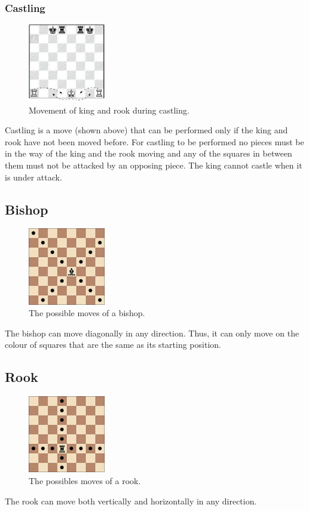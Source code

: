 \subsubsection{Castling}
\begin{figure}[H]
\centering
	\includegraphics[width=0.3\textwidth]{images/boards/castling}
	\caption{Movement of king and rook during castling.}
\end{figure}
Castling is a move (shown above) that can be performed only if the king and rook have not been moved before. For castling to be performed no pieces must be in the way of the king and the rook moving and any of the squares in between them must not be attacked by an opposing piece. The king cannot castle when it is under attack.
\subsection{Bishop}
\begin{figure}[H]
\centering
	\includegraphics[width=0.3\textwidth]{images/boards/bishop_movement}
	\caption{The possible moves of a bishop.}
\end{figure}
The bishop can move diagonally in any direction. Thus, it can only move on the colour of squares that are the same as its starting position.	
\subsection{Rook}
\begin{figure}[H]
\centering
	\includegraphics[width=0.3\textwidth]{images/boards/rook_movement}
	\caption{The possibles moves of a rook.}
	\label{rook-possible-moves}
\end{figure}
The rook can move both vertically and horizontally in any direction.
